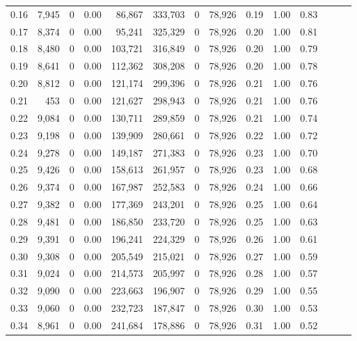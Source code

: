 \begin{tabular}{rrrrrrrrrrrrrr}
0.16 &  7,945 &      0 &  0.00 &   86,867 &  333,703 &       0 &  78,926 &  0.19 &  1.00 &      0.83 \\
0.17 &  8,374 &      0 &  0.00 &   95,241 &  325,329 &       0 &  78,926 &  0.20 &  1.00 &      0.81 \\
0.18 &  8,480 &      0 &  0.00 &  103,721 &  316,849 &       0 &  78,926 &  0.20 &  1.00 &      0.79 \\
0.19 &  8,641 &      0 &  0.00 &  112,362 &  308,208 &       0 &  78,926 &  0.20 &  1.00 &      0.78 \\
0.20 &  8,812 &      0 &  0.00 &  121,174 &  299,396 &       0 &  78,926 &  0.21 &  1.00 &      0.76 \\
0.21 &    453 &      0 &  0.00 &  121,627 &  298,943 &       0 &  78,926 &  0.21 &  1.00 &      0.76 \\
0.22 &  9,084 &      0 &  0.00 &  130,711 &  289,859 &       0 &  78,926 &  0.21 &  1.00 &      0.74 \\
0.23 &  9,198 &      0 &  0.00 &  139,909 &  280,661 &       0 &  78,926 &  0.22 &  1.00 &      0.72 \\
0.24 &  9,278 &      0 &  0.00 &  149,187 &  271,383 &       0 &  78,926 &  0.23 &  1.00 &      0.70 \\
0.25 &  9,426 &      0 &  0.00 &  158,613 &  261,957 &       0 &  78,926 &  0.23 &  1.00 &      0.68 \\
0.26 &  9,374 &      0 &  0.00 &  167,987 &  252,583 &       0 &  78,926 &  0.24 &  1.00 &      0.66 \\
0.27 &  9,382 &      0 &  0.00 &  177,369 &  243,201 &       0 &  78,926 &  0.25 &  1.00 &      0.64 \\
0.28 &  9,481 &      0 &  0.00 &  186,850 &  233,720 &       0 &  78,926 &  0.25 &  1.00 &      0.63 \\
0.29 &  9,391 &      0 &  0.00 &  196,241 &  224,329 &       0 &  78,926 &  0.26 &  1.00 &      0.61 \\
0.30 &  9,308 &      0 &  0.00 &  205,549 &  215,021 &       0 &  78,926 &  0.27 &  1.00 &      0.59 \\
0.31 &  9,024 &      0 &  0.00 &  214,573 &  205,997 &       0 &  78,926 &  0.28 &  1.00 &      0.57 \\
0.32 &  9,090 &      0 &  0.00 &  223,663 &  196,907 &       0 &  78,926 &  0.29 &  1.00 &      0.55 \\
0.33 &  9,060 &      0 &  0.00 &  232,723 &  187,847 &       0 &  78,926 &  0.30 &  1.00 &      0.53 \\
0.34 &  8,961 &      0 &  0.00 &  241,684 &  178,886 &       0 &  78,926 &  0.31 &  1.00 &      0.52 \\

\end{tabular}
